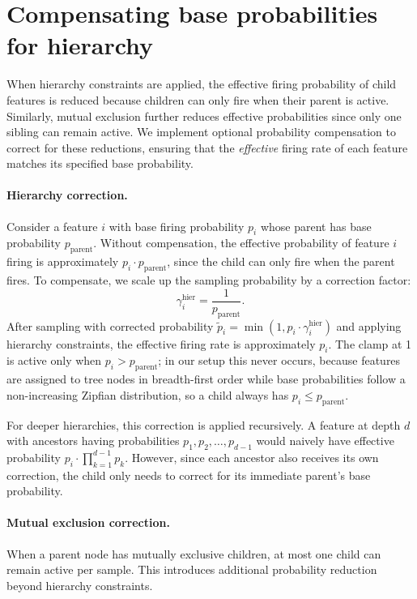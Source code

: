 \documentclass{article}
\theoremstyle{plain}
\theoremstyle{definition}
\theoremstyle{remark}
\begin{document}
\section{Compensating base probabilities for hierarchy}
\label{apx:compensate}

When hierarchy constraints are applied, the effective firing probability of child features is reduced because children can only fire when their parent is active. Similarly, mutual exclusion further reduces effective probabilities since only one sibling can remain active. We implement optional probability compensation to correct for these reductions, ensuring that the \emph{effective} firing rate of each feature matches its specified base probability.

\paragraph{Hierarchy correction.} Consider a feature $i$ with base firing probability $p_i$ whose parent has base probability $p_{\text{parent}}$. Without compensation, the effective probability of feature $i$ firing is approximately $p_i \cdot p_{\text{parent}}$, since the child can only fire when the parent fires. To compensate, we scale up the sampling probability by a correction factor:
\begin{equation}
    \gamma_i^{\text{hier}} = \frac{1}{p_{\text{parent}}}.
\end{equation}
After sampling with corrected probability $\tilde{p}_i = \min(1, p_i \cdot \gamma_i^{\text{hier}})$ and applying hierarchy constraints, the effective firing rate is approximately $p_i$. The clamp at 1 is active only when $p_i > p_{\text{parent}}$; in our setup this never occurs, because features are assigned to tree nodes in breadth-first order while base probabilities follow a non-increasing Zipfian distribution, so a child always has $p_i \le p_{\text{parent}}$.

For deeper hierarchies, this correction is applied recursively. A feature at depth $d$ with ancestors having probabilities $p_1, p_2, \ldots, p_{d-1}$ would naively have effective probability $p_i \cdot \prod_{k=1}^{d-1} p_k$. However, since each ancestor also receives its own correction, the child only needs to correct for its immediate parent's base probability.

\paragraph{Mutual exclusion correction.} When a parent node has mutually exclusive children, at most one child can remain active per sample. This introduces additional probability reduction beyond hierarchy constraints.
\end{document}
